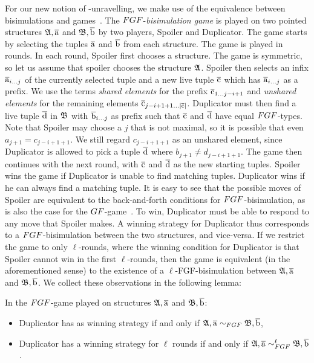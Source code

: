 For our new notion of \FGF-unravelling, we make use of the equivalence between bisimulations and games~\cite[Sec. 1.2.1]{Gradel014}.
The $\FGF$-\emph{bisimulation game} is played on two pointed structures ${\mathfrak{A}}, \overline{\mathrm{a}}$ and ${\mathfrak{B}}, \overline{\mathrm{b}}$ by two players, Spoiler and Duplicator.
The game starts by selecting the tuples $\overline{\mathrm{a}}$ and $\overline{\mathrm{b}}$ from each structure.
The game is played in rounds.
In each round, Spoiler first chooses a structure.
The game is symmetric, so let us assume that spoiler chooses the structure ${\mathfrak{A}}$.
Spoiler then selects an infix $\overline{\mathrm{a}}_{i\ldots j}$ of the currently selected tuple and a new live tuple $\overline{\mathrm{c}}$ which has $\overline{\mathrm{a}}_{i\ldots j}$ as a prefix.
We use the terms \emph{shared elements} for the prefix $\overline{\mathrm{c}}_{1\ldots j-i+1}$ and \emph{unshared elements} for the remaining elements $\overline{\mathrm{c}}_{j-i+1+1\ldots|\overline{\mathrm{c}}|}$.
Duplicator must then find a live tuple $\overline{\mathrm{d}}$ in ${\mathfrak{B}}$ with $\overline{\mathrm{b}}_{i\ldots j}$ as prefix such that $\overline{\mathrm{c}}$ and $\overline{\mathrm{d}}$ have equal $\FGF$-types.
Note that Spoiler may choose a $j$ that is not maximal, so it is possible that even $a_{j+1} = c_{j-i+1+1}$.
We still regard $c_{j-i+1+1}$ as an unshared element, since Duplicator is allowed to pick a tuple $\overline{\mathrm{d}}$ where $b_{j+1} \neq d_{j-i+1+1}$.
The game then continues with the next round, with $\overline{\mathrm{c}}$ and $\overline{\mathrm{d}}$ as the new starting tuples.
Spoiler wins the game if Duplicator is unable to find matching tuples.
Duplicator wins if he can always find a matching tuple.
It is easy to see that the possible moves of Spoiler are equivalent to the back-and-forth conditions for $\FGF$-bisimulation, as is also the case for the $\GF$-game~\cite[Sec.\ 3.2]{Gradel014}.
To win, Duplicator must be able to respond to any move that Spoiler makes.
A winning strategy for Duplicator thus corresponds to a $\FGF$-bisimulation between the two structures, and vice-versa.
If we restrict the game to only $\ell$-rounds, where the winning condition for Duplicator is that Spoiler cannot win in the first $\ell$-rounds, then the game is equivalent (in the aforementioned sense) to the existence of a $\ell$-FGF-bisimulation between ${\mathfrak{A}}, \overline{\mathrm{a}}$ and ${\mathfrak{B}}, \overline{\mathrm{b}}$.
We collect these observations in the following lemma:

\begin{lemma}
  In the $\FGF$-game played on structures ${\mathfrak{A}}, \overline{\mathrm{a}}$ and ${\mathfrak{B}}, \overline{\mathrm{b}}$:
  \begin{itemize}
    \item Duplicator has as winning strategy if and only if $\str{A}, \elemtuplea \bisimto_{\FGF} \str{B}, \elemtupleb$,
    \item Duplicator has a winning strategy for $\ell$ rounds if and only if $\str{A}, \elemtuplea \bisimto_{\FGF}^{\ell} \str{B}, \elemtupleb$.
  \end{itemize}
\end{lemma}

